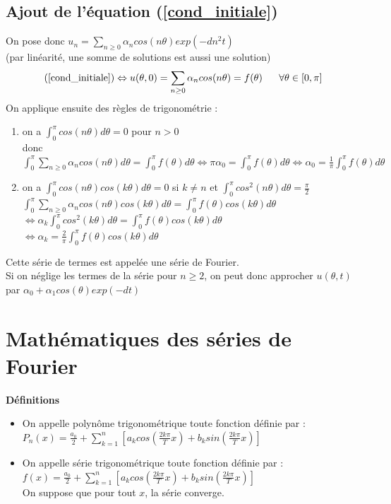 \documentclass[a4paper,10pt]{report}
\begin{document}
\subsection{Ajout de l'équation (\ref{cond_initiale})}
On pose donc $u_n = \sum \limits_{n\geq0}\alpha_n cos(n \theta) exp(-dn^2t)$ \\(par linéarité, une somme de solutions est aussi une solution)\\
\abovedisplayskip=0mm
\begin{displaymath}
\text{(\ref{cond_initiale})} \Leftrightarrow u(\theta,0) = \sum \limits_{n\geq 0} \alpha_n cos(n \theta) = f(\theta)  \ \ \ \ \ \forall \theta \in [0,\pi] \\
\end{displaymath}
On applique ensuite des règles de trigonométrie :
\begin{enumerate}
\item on a $\int_0^{\pi}cos(n \theta) d\theta = 0$ pour $n>0$ \\
donc $\int_0^{\pi} \sum \limits_{n\geq 0} \alpha_n cos(n \theta) d\theta = \int_0^{\pi}f(\theta) d\theta \Leftrightarrow \pi \alpha_0 = \int_0^{\pi}f(\theta) d\theta \Leftrightarrow \alpha_0 = \frac{1}{\pi} \int_0^{\pi}f(\theta) d\theta$
\item on a $\int_0^{\pi}cos(n \theta)cos(k \theta) d\theta = 0$ si $k \neq n$ et $\int_0^{\pi}cos^2(n \theta) d\theta = \frac{\pi}{2}$\\
$\int_0^{\pi} \sum \limits_{n\geq 0} \alpha_n cos(n \theta) cos(k \theta) d\theta = \int_0^{\pi} f(\theta) cos(k \theta) d\theta$ \\
$\Leftrightarrow \alpha_k \int_0^{\pi}cos^2(k\theta)d\theta = \int_0^{\pi}f(\theta)cos(k\theta)d\theta$ \\
$\Leftrightarrow \alpha_k = \frac{2}{\pi} \int_0^{\pi}f(\theta)cos(k\theta)d\theta $
\end{enumerate}
Cette série de termes est appelée une série de Fourier. \\
Si on néglige les termes de la série pour $n\geq 2$, on peut donc approcher $u(\theta,t)$ par $\alpha_0 + \alpha_1cos(\theta)exp(-dt)$

\section{Mathématiques des séries de Fourier}
\noindent \textbf{Définitions}
\begin{itemize}
\item On appelle polynôme trigonométrique toute fonction définie par :\\
$P_n(x) = \frac{a_0}{2} + \sum \limits_{k=1}^n \left[ a_k cos\left(\frac{2k\pi}{T}x\right) + b_k sin\left(\frac{2k\pi}{T}x\right) \right]$
\item On appelle série trigonométrique toute fonction définie par :\\
$f(x) = \frac{a_0}{2} + \sum \limits_{k=1}^n \left[ a_k cos\left(\frac{2k\pi}{T}x\right) + b_k sin\left(\frac{2k\pi}{T}x\right) \right]$ \\
On suppose que pour tout $x$, la série converge.
\end{itemize}
\end{document}
